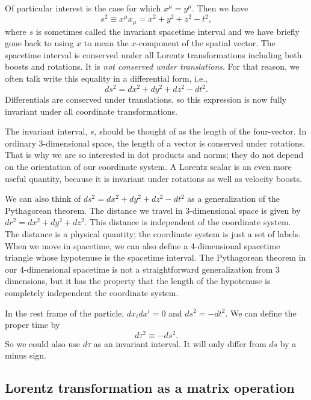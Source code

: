 \documentclass{article}
\begin{document}
Of particular interest is the case for which $x^\mu = y^\mu$. Then we have \begin{equation} s^2 \equiv x^\mu x_\mu = x^2 + y^2 + z^2 - t^2 , \end{equation} where $s$ is sometimes called the invariant spacetime interval and we have briefly gone back to using $x$ to mean the $x$-component of the spatial vector. The spacetime interval is conserved under all Lorentz transformations including both boosts and rotations. It is \emph{not conserved under translations}. For that reason, we often talk write this equality in a differential form, i.e., \begin{equation} ds^2 = dx^2 + dy^2 + dz^2 - dt^2 . \end{equation} Differentials are conserved under translations, so this expression is now fully invariant under all coordinate transformations.

The invariant interval, $s$, should be thought of as the length of the four-vector. In ordinary 3-dimensional space, the length of a vector is conserved under rotations. That is why we are so interested in dot products and norms; they do not depend on the orientation of our coordinate system. A Lorentz scalar is an even more useful quantity, because it is invariant under rotations as well as velocity boosts.

We can also think of $ds^2 = dx^2 + dy^2 + dz^2 - dt^2$ as a generalization of the Pythagorean theorem. The distance we travel in 3-dimensional space is given by $dr^2 = dx^2 + dy^2 + dz^2$. This distance is independent of the coordinate system. The distance is a physical quantity; the coordinate system is just a set of labels. When we move in spacetime, we can also define a 4-dimensional spacetime triangle whose hypotenuse is the spacetime interval. The Pythagorean theorem in our 4-dimensional spacetime is not a straightforward generalization from 3 dimensions, but it has the property that the length of the hypotenuse is completely independent the coordinate system.

In the rest frame of the particle, $dx_i dx^i = 0$ and $ds^2 = -dt^2$. We can define the proper time by \begin{equation} d \tau^2 \equiv - ds^2 . \end{equation} So we could also use $d \tau$ as an invariant interval. It will only differ from $ds$ by a minus sign.

\subsection{Lorentz transformation as a matrix operation}
\end{document}
